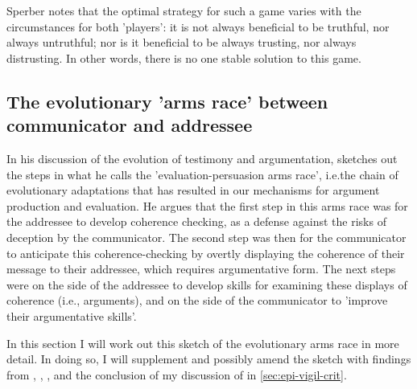 Sperber notes that the optimal strategy for such a game varies with the circumstances for both 'players': it is not always beneficial to be truthful, nor always untruthful; nor is it beneficial to be always trusting, nor always distrusting. In other words, there is no one stable solution to this game.



\subsection{The evolutionary 'arms race' between communicator and addressee}
\label{sec:arms-race}


In his discussion of the evolution of testimony and argumentation,\citet{Sperber01} sketches out the steps in what he calls the 'evaluation-persuasion arms race', i.e.\@ the chain of evolutionary adaptations that has resulted in our mechanisms for argument production and evaluation.
He argues that the first step in this arms race was for the addressee to develop coherence checking, as a defense against the risks of deception by the communicator. The second step was then for the communicator to anticipate this coherence-checking by overtly displaying the coherence of their message to their addressee, which requires argumentative form. The next steps were on the side of the addressee to develop skills for examining these displays of coherence (i.e., arguments), and on the side of the communicator to 'improve their argumentative skills'.

In this section I will work out this sketch of the evolutionary arms race in more detail. In doing so, I will supplement and possibly amend the sketch with findings from \citet{Sperber10}, \citet{MS11}, \citet{Reboul17}, and the conclusion of my discussion of \citet{Michaelian13} in \cref{sec:epi-vigil-crit}.

